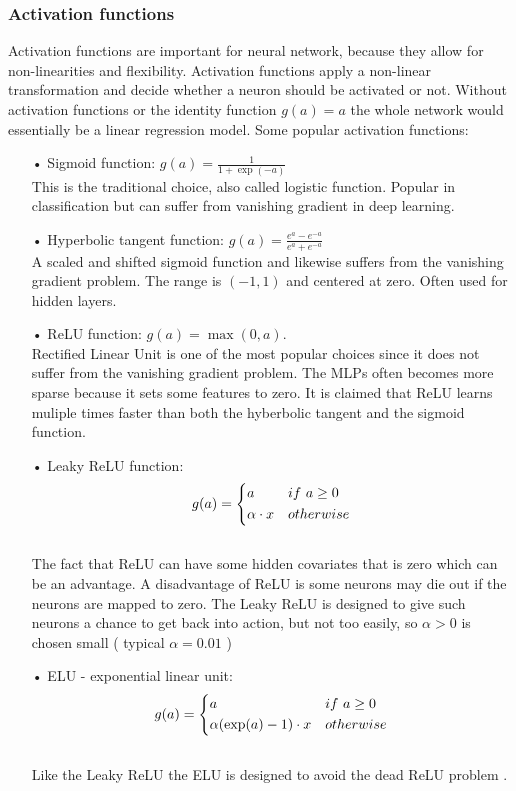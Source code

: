 \subsubsection{Activation functions}
Activation functions are important for neural network, because they allow for non-linearities and flexibility. Activation functions apply a non-linear transformation and decide whether a neuron should be activated or not. Without activation functions or the identity function $g(a)=a$ the whole network would essentially be a linear regression model. Some popular activation functions:
\begin{enumerate}
\item[•] Sigmoid function: $g(a)=\frac{1}{1+\exp(-a)}$\\

This is the traditional choice, also called logistic function. Popular in classification but can suffer from vanishing gradient in deep learning.
\item[•] Hyperbolic tangent function: $g(a)=\frac{e^a-e^{-a}}{e^a+e^{-a}}$\\

A scaled and shifted sigmoid function and likewise suffers from the vanishing gradient problem. The range is $(-1,1)$ and centered at zero. Often used for hidden layers.
\item[•] ReLU function: $g(a)=\max(0,a)$.\\

Rectified Linear Unit is one of the most popular choices since it does not suffer from the vanishing gradient problem. The MLPs often becomes more sparse because it sets some features to zero. It is claimed that ReLU learns muliple times faster than both the hyberbolic tangent and the sigmoid function.
\item[•] Leaky ReLU function:  \[ g(a)=
    \begin{dcases}
        a & if \ a \geq 0 \\
        \alpha \cdot x & otherwise \\
    \end{dcases}
\]\\
The fact that ReLU can have some hidden covariates that is zero which can be an advantage. A disadvantage of ReLU is some neurons may die out if the neurons are mapped to zero. The Leaky ReLU is designed to give such neurons a chance to get back into action, but not too easily, so $\alpha>0$ is chosen small ( typical $\alpha=0.01$ ) 

\item[•] ELU - exponential linear unit:  \[ g(a)=
    \begin{dcases}
        a & if \ a \geq 0 \\
        \alpha(\exp(a)-1) \cdot x & otherwise \\
    \end{dcases}
\]\\
Like the Leaky ReLU the ELU is designed to avoid the dead ReLU problem \parencite{Goodfellow-et-al-2016}. 
\end{enumerate}

